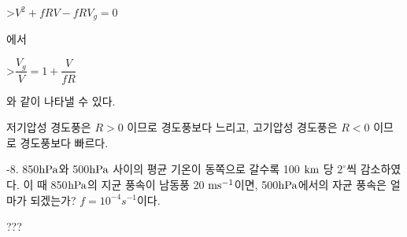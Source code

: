 >$ V^{2} + fRV - f R V_{g} = 0$

에서 

>$ \dfrac{V_{g}}{V} = 1 + \dfrac{V}{fR}$

와 같이 나타낼 수 있다. 

저기압성 경도풍은  $ R > 0$ 이므로 경도풍보다 느리고, 고기압성 경도풍은  $ R < 0$ 이므로 경도풍보다 빠르다.


-8. 850$\rm hPa$와  500$\rm hPa$ 사이의 평균 기온이 동쪽으로 갈수록 100 $\rm km$ 당  $2^{\circ}$씩 감소하였다. 이 때 850$\rm hPa$의 지균 풍속이 남동풍 20 $\rm m s^{-1}$이면, 500$\rm hPa$에서의 자균 풍속은 얼마가 되겠는가? $ f = 10^{-4} s^{-1}$이다. 


???























